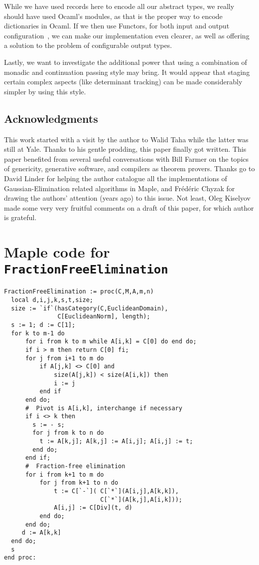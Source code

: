 \documentclass[11pt]{elsart}
\begin{document}
While we have used records here to encode all our abstract types,
we really should have used Ocaml's modules, as that is the proper way
to encode dictionaries in Ocaml.  If we then use Functors, for both
input and output configuration~\cite{KiselyovPersonal}, we can make
our implementation even clearer, as well as offering a solution to the
problem of configurable output types.

Lastly, we want to investigate the additional power that using a
combination of monadic and continuation passing style may bring.  It
would appear that staging certain complex aspects (like determinant
tracking) can be made considerably simpler by using this style.

\subsection{Acknowledgments}

This work started with a visit by the author to Walid Taha while the latter
was still at Yale.  Thanks to his gentle prodding, this paper finally 
got written.  This paper benefited from several useful conversations
with Bill Farmer on the topics of genericity, generative software, and
compilers as theorem provers.  Thanks go to David Linder for helping
the author catalogue all the implementations of Gaussian-Elimination
related algorithms in Maple, and Fr\'{e}d\'{e}ric Chyzak for drawing
the authors' attention (years ago) to this issue.  Not least, Oleg 
Kiselyov made some very very fruitful comments on a draft of this paper, for
which author is grateful.


  

\appendix
\section{Maple code for \texttt{FractionFreeElimination}}
\label{FractionFreeElimination}
\begin{small}
\begin{verbatim}
FractionFreeElimination := proc(C,M,A,m,n) 
  local d,i,j,k,s,t,size;
  size := `if`(hasCategory(C,EuclideanDomain), 
               C[EuclideanNorm], length);
  s := 1; d := C[1];
  for k to m-1 do
      for i from k to m while A[i,k] = C[0] do end do;
      if i > m then return C[0] fi;
      for j from i+1 to m do
          if A[j,k] <> C[0] and 
              size(A[j,k]) < size(A[i,k]) then 
              i := j 
          end if
      end do;
      #  Pivot is A[i,k], interchange if necessary
      if i <> k then
        s := - s;
        for j from k to n do 
          t := A[k,j]; A[k,j] := A[i,j]; A[i,j] := t;
        end do;
      end if;
      #  Fraction-free elimination
      for i from k+1 to m do
          for j from k+1 to n do 
              t := C[`-`]( C[`*`](A[i,j],A[k,k]), 
                           C[`*`](A[k,j],A[i,k]));
              A[i,j] := C[Div](t, d)
          end do;
      end do;
     d := A[k,k]
  end do;
  s
end proc:
\end{verbatim}
\end{small}
\end{document}
